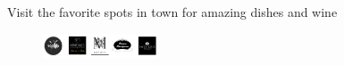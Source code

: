 Visit the favorite spots in town for amazing dishes and wine
\begin{figure}
  \begin{center}
    \leavevmode
    \includegraphics[width=0.3\textwidth]{./figures/restaurants.png}
  \end{center}
\end{figure}
